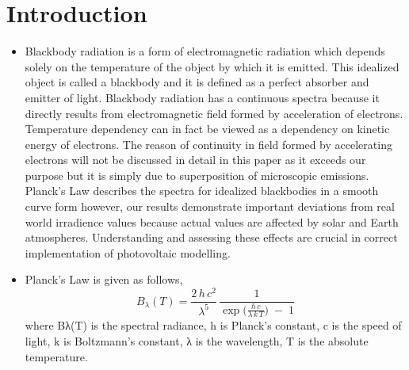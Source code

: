 \documentclass[11pt,a4paper]{article}
\begin{document}
\section{Introduction}
\begin{itemize}
  \item Blackbody radiation is a form of electromagnetic radiation which depends solely on the temperature of the object by which it is emitted. This idealized object is called a blackbody and it is defined as a perfect absorber and emitter of light. Blackbody radiation has a continuous spectra because it directly results from electromagnetic field formed by acceleration of electrons. Temperature dependency can in fact be viewed as a dependency on kinetic energy of electrons. The reason of continuity in field formed by accelerating electrons will not be discussed in detail in this paper as it exceeds our purpose but it is simply due to superposition of microscopic emissions.  Planck's Law describes the spectra for idealized blackbodies in a smooth curve form however, our results demonstrate important deviations from real world irradience values because actual values are affected by solar and Earth atmospheres. Understanding and assessing these effects are crucial in correct implementation of photovoltaic modelling.
  \item Planck's Law is given as follows,
  \begin{equation}
B_\lambda(T)
=
\frac{2\,h\,c^2}{\lambda^5}
\,
\frac{1}{\exp\!\bigl(\tfrac{h\,c}{\lambda\,k\,T}\bigr)\;-\;1}
\end{equation}
where Bλ(T) is the spectral radiance, h is Planck’s constant, c is the speed of light, k is Boltzmann’s constant, λ is the wavelength, T is the absolute temperature.
\end{itemize}
\end{document}
